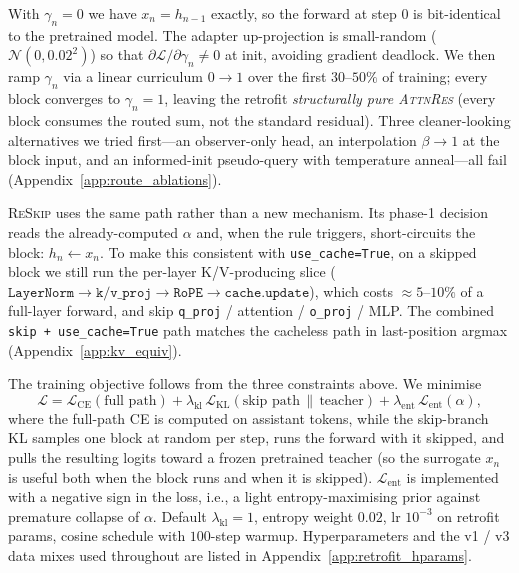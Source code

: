 \documentclass{article}
\newcommand{\attnres}{\textsc{AttnRes}}
\newcommand{\reskip}{\textsc{ReSkip}}
\begin{document}
With $\gamma_n{=}0$ we have $x_n = h_{n-1}$ exactly, so the forward at step $0$ is bit-identical to the pretrained model. The adapter up-projection is small-random ($\mathcal{N}(0,0.02^2)$) so that $\partial\mathcal{L}/\partial\gamma_n \ne 0$ at init, avoiding gradient deadlock. We then ramp $\gamma_n$ via a linear curriculum $0\to 1$ over the first $30$--$50\%$ of training; every block converges to $\gamma_n{=}1$, leaving the retrofit \emph{structurally pure \attnres{}} (every block consumes the routed sum, not the standard residual). Three cleaner-looking alternatives we tried first---an observer-only head, an interpolation $\beta\to 1$ at the block input, and an informed-init pseudo-query with temperature anneal---all fail (Appendix~\ref{app:route_ablations}).

\reskip{} uses the same path rather than a new mechanism. Its phase-1 decision reads the already-computed $\alpha$ and, when the rule triggers, short-circuits the block: $h_n\!\leftarrow\!x_n$. To make this consistent with \texttt{use\_cache=True}, on a skipped block we still run the per-layer K/V-producing slice ($\texttt{LayerNorm}\!\to\!\texttt{k/v\_proj}\!\to\!\texttt{RoPE}\!\to\!\texttt{cache.update}$), which costs ${\approx}5$--$10\%$ of a full-layer forward, and skip \texttt{q\_proj} / attention / \texttt{o\_proj} / MLP. The combined \texttt{skip\,+\,use\_cache=True} path matches the cacheless path in last-position argmax (Appendix~\ref{app:kv_equiv}).

The training objective follows from the three constraints above. We minimise
\begin{equation}
  \mathcal{L} = \mathcal{L}_{\text{CE}}(\text{full path}) + \lambda_{\text{kl}}\,\mathcal{L}_{\text{KL}}(\text{skip path}\,\|\,\text{teacher}) + \lambda_{\text{ent}}\,\mathcal{L}_{\text{ent}}(\alpha) ,
  \label{eq:retrofit_loss}
\end{equation}
where the full-path CE is computed on assistant tokens, while the skip-branch KL samples one block at random per step, runs the forward with it skipped, and pulls the resulting logits toward a frozen pretrained teacher (so the surrogate $x_n$ is useful both when the block runs and when it is skipped). $\mathcal{L}_{\text{ent}}$ is implemented with a negative sign in the loss, i.e., a light entropy-maximising prior against premature collapse of $\alpha$. Default $\lambda_{\text{kl}}{=}1$, entropy weight $0.02$, lr $10^{-3}$ on retrofit params, cosine schedule with $100$-step warmup. Hyperparameters and the v1 / v3 data mixes used throughout are listed in Appendix~\ref{app:retrofit_hparams}.
\end{document}
